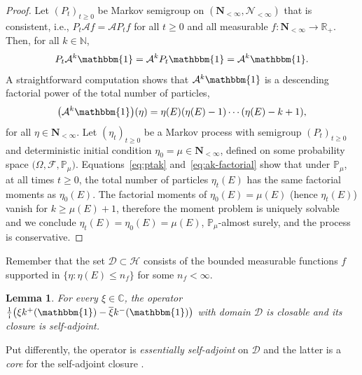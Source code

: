 \documentclass[11pt]{article}
\numberwithin{equation}{section}
\numberwithin{equation}{section}
\newtheorem{Lemma}[Theorem]{Lemma}
\newcommand{\N}{\mathbb{N}}
\newcommand{\R}{\mathbb{R}}
\newcommand{\C}{\mathbb{C}}
\renewcommand{\P}{\mathbb{P}}
\newcommand{\one}{\mathbbm{1}}
\newcommand{\1}{\mathbbm{1}}
\begin{document}
\begin{proof}
	Let $(P_t)_{t\geq 0}$ be Markov semigroup on $(\mathbf N_{<\infty}, \mathcal N_{<\infty})$ that is consistent, i.e., $P_t \mathcal A f = \mathcal A P_t f$ for all $t\geq 0$ and all measurable $f\colon \mathbf N_{<\infty} \to \R_+$. Then, for all $k\in \N$,
	\begin{equation} \label{eq:ptak}
		P_t \mathcal A^k \one = \mathcal A^k P_t \one = \mathcal A^k \one.
	\end{equation}
	A straightforward computation shows that $\mathcal A^k\one$ is a descending factorial power of the total number of particles,
	\begin{equation} \label{eq:ak-factorial}
		\bigl( \mathcal A^k \one \bigr)(\eta) = \eta(E)( \eta(E)-1) \cdots ( \eta(E) - k +1),
	\end{equation}
	for all $\eta \in \mathbf N_{<\infty}$. Let $(\eta_t)_{t\geq 0}$ be a Markov process with semigroup $(P_t)_{t\geq 0}$ and deterministic initial condition $\eta_0=\mu \in \mathbf N_{<\infty}$, defined on some probability space $\bigl(\Omega,\mathscr F, \mathbb P_\mu\bigr)$. Equations~\eqref{eq:ptak} and~\eqref{eq:ak-factorial} show that under $\mathbb P_\mu$, at all times $t\geq 0$, the total number of particles $\eta_t(E)$ has the same factorial moments as $\eta_0(E)$. The factorial moments of $\eta_0(E) = \mu(E)$ (hence $\eta_t(E)$) vanish for $k\geq \mu(E)+1$, therefore the moment problem is uniquely solvable and we conclude $\eta_t(E) = \eta_0(E) = \mu(E)$, $\P_\mu$-almost surely, and the process is conservative.
\end{proof}

Remember that the set $\mathcal D\subset \mathcal H$ consists of the bounded measurable functions $f$ supported in $\{\eta\colon \eta(E)\leq n_f\}$ for some $n_f<\infty$.

\begin{Lemma} \label{lem:closure}
	For every $\xi \in \C$, the operator $\frac{1}{\mathrm i} \bigl( \xi k^+(\1) - \overline{\xi} k^-(\1)\bigr)$ with domain $\mathcal D$ is closable and its closure is self-adjoint.
\end{Lemma}

Put differently, the operator is \emph{essentially self-adjoint} on $\mathcal D$ and the latter is a \emph{core} for the self-adjoint closure \cite[Section VIII.2]{reedSimonI}.
\end{document}
